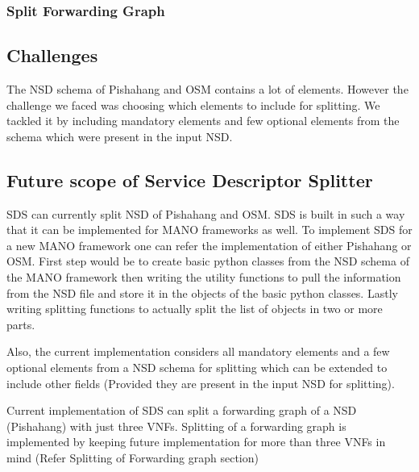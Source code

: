 \subsubsection{Split Forwarding Graph}

\subsection{Challenges}
The NSD schema of Pishahang and OSM contains a lot of elements. However the challenge we faced was choosing which elements to include for splitting. We tackled it by including mandatory elements and few optional elements from the schema which were present in the input NSD.
\subsection{Future scope of Service Descriptor Splitter}
SDS can currently split NSD of Pishahang and OSM. SDS is built in such a way that it can be implemented for MANO frameworks as well. To implement SDS for a new MANO framework one can refer the implementation of either Pishahang or OSM. First step would be to create basic python classes from the NSD schema of the MANO framework then writing the utility functions to pull the information from the NSD file and store it in the objects of the basic python classes. Lastly writing splitting functions to actually split the list of objects in two or more parts.

Also, the current implementation considers all mandatory elements and a few optional elements from a NSD schema for splitting which can be extended to include other fields (Provided they are present in the input NSD for splitting).

Current implementation of SDS can split a forwarding graph of a NSD (Pishahang) with just three VNFs. Splitting of a forwarding graph is implemented by keeping future implementation for more than three VNFs in mind (Refer Splitting of Forwarding graph section)



